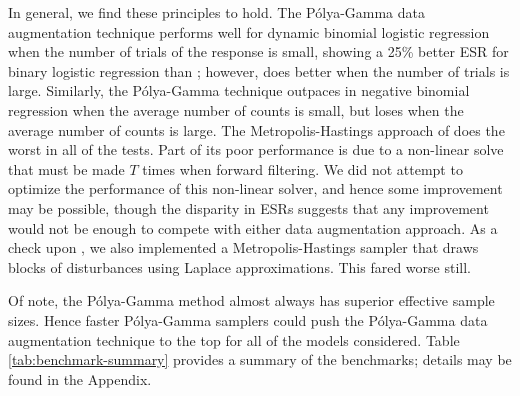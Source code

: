 \documentclass[12pt]{article}
\newcommand{\Polya}{P\'{o}lya}
\begin{document}
In general, we find these principles to hold.  The \Polya-Gamma data
augmentation technique performs well for dynamic binomial logistic regression
when the number of trials of the response is small, showing a 25\% better ESR
for binary logistic regression than \cite{fussl-etal-2013}; however,
\cite{fussl-etal-2013} does better when the number of trials is large.
Similarly, the \Polya-Gamma technique outpaces
\cite{fruhwirth-schnatter-etal-2009} in negative binomial regression when the
average number of counts is small, but loses when the average number of counts
is large.  The Metropolis-Hastings approach of \cite{migon-etal-2013} does the
worst in all of the tests.  Part of its poor performance is due to a non-linear
solve that must be made $T$ times when forward filtering.  We did not attempt to
optimize the performance of this non-linear solver, and hence some improvement
may be possible, though the disparity in ESRs suggests that any improvement
would not be enough to compete with either data augmentation approach.  As a
check upon \cite{migon-etal-2013}, we also implemented a Metropolis-Hastings
sampler that draws blocks of disturbances using Laplace approximations.  This
fared worse still.

Of note, the \Polya-Gamma method almost always has superior effective sample
sizes.  Hence faster \Polya-Gamma samplers could push the \Polya-Gamma data
augmentation technique to the top for all of the models considered.  Table
\ref{tab:benchmark-summary} provides a summary of the benchmarks; details may be
found in the Appendix.
\end{document}
